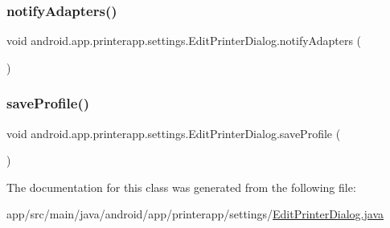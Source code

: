 \subsubsection{\texorpdfstring{notify\+Adapters()}{notifyAdapters()}}
{\footnotesize\ttfamily void android.\+app.\+printerapp.\+settings.\+Edit\+Printer\+Dialog.\+notify\+Adapters (\begin{DoxyParamCaption}{ }\end{DoxyParamCaption})}

\mbox{\label{classandroid_1_1app_1_1printerapp_1_1settings_1_1_edit_printer_dialog_ad00adaeeaaee1724c62efe72c613d722}} 
\subsubsection{\texorpdfstring{save\+Profile()}{saveProfile()}}
{\footnotesize\ttfamily void android.\+app.\+printerapp.\+settings.\+Edit\+Printer\+Dialog.\+save\+Profile (\begin{DoxyParamCaption}{ }\end{DoxyParamCaption})}



The documentation for this class was generated from the following file\+:\begin{DoxyCompactItemize}
\item 
app/src/main/java/android/app/printerapp/settings/\hyperlink{_edit_printer_dialog_8java}{Edit\+Printer\+Dialog.\+java}\end{DoxyCompactItemize}
